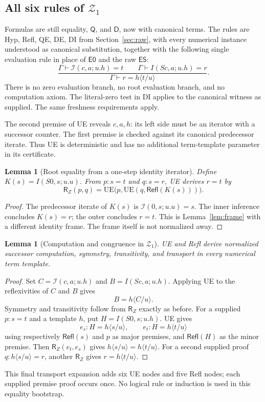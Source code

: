 \documentclass[11pt]{article}
\newtheorem{lemma}[theorem]{Lemma}
\theoremstyle{definition}\newtheorem{definition}[theorem]{Definition}
\newcommand{\Zone}{\mathcal Z_1}
\newcommand{\Q}{\mathsf Q}
\newcommand{\D}{\mathsf D}
\newcommand{\sI}{\mathcal I}
\newcommand{\Refl}{\mathsf{Refl}}
\newcommand{\evz}{\mathsf{E0}}
\newcommand{\evs}{\mathsf{ES}}
\newcommand{\RC}{\mathsf{R}}
\begin{document}
\subsection{All six rules of \texorpdfstring{$\Zone$}{Z1}}

Formulas are still equality, $\Q$, and $\D$, now with canonical terms.
The rules are Hyp, Refl, QE, DE, DI from Section~\ref{sec:raw}, with
every numerical instance understood as canonical substitution, together
with the following single evaluation rule in place of $\evz$ and
the raw $\evs$:
\[
 \frac{\Gamma\vdash\sI(c,a;u.h)=t\qquad
        \Gamma\vdash I(Sc,a;u.h)=r}
      {\Gamma\vdash r=h\langle t/u\rangle}.
 \tag{UE}\label{eq:ue}
\]
There is no zero evaluation branch, no root evaluation branch, and no
computation axiom. The literal-zero test in DI applies to the canonical
witness as supplied. The same freshness requirements apply.

The second premise of UE reveals $c,a,h$: its left side must be an
iterator with a successor counter. The first premise is checked against
its canonical predecessor iterate. Thus UE is deterministic and has no
additional term-template parameter in its certificate.

\begin{lemma}[Root equality from a one-step identity iterator]
Define $K(s)=I(S0,s;u.u)$. From $p:s=t$ and $q:s=r$, UE derives
$r=t$ by
\[
 \RC_Z(p,q)=\mathrm{UE}\bigl(p,
                  \mathrm{UE}(q,\Refl(K(s)))\bigr).
\]
\end{lemma}
\begin{proof}
The predecessor iterate of $K(s)$ is
$\sI(0,s;u.u)=s$. The inner inference concludes $K(s)=r$; the outer
concludes $r=t$. This is Lemma~\ref{lem:frame} with a different
identity frame. The frame itself is not normalized away.
\end{proof}

\begin{lemma}[Computation and congruence in $\Zone$]\label{lem:normaltr}
UE and Refl derive normalized successor computation, symmetry,
transitivity, and transport in every numerical term template.
\end{lemma}
\begin{proof}
Set $C=\sI(c,a;u.h)$ and $B=I(Sc,a;u.h)$. Applying UE to the
reflexivities of $C$ and $B$ gives
\[
 B=h\langle C/u\rangle.
\]
Symmetry and transitivity follow from $\RC_Z$ exactly as before.
For a supplied $p:s=t$ and a template $h$, put
$H=I(S0,s;u.h)$. UE gives
\[
 e_s:H=h\langle s/u\rangle,\qquad
 e_t:H=h\langle t/u\rangle
\]
using respectively $\Refl(s)$ and $p$ as major premises, and
$\Refl(H)$ as the minor premise. Then $\RC_Z(e_t,e_s)$ gives
$h\langle s/u\rangle=h\langle t/u\rangle$.
For a second supplied proof $q:h\langle s/u\rangle=r$, another
$\RC_Z$ gives $r=h\langle t/u\rangle$.
\end{proof}
This final transport expansion adds six UE nodes and five Refl nodes;
each supplied premise proof occurs once. No logical rule or induction is
used in this equality bootstrap.
\end{document}
